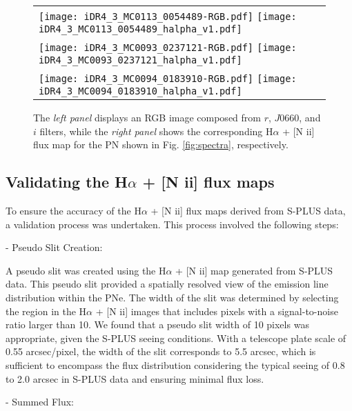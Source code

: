 \documentclass[baaa]{baaa}
\begin{document}
\begin{figure}[h]
\centering
\begin{tabular}{l l}
  \texttt{[image: iDR4\_3\_MC0113\_0054489-RGB.pdf]}
  \texttt{[image: iDR4\_3\_MC0113\_0054489\_halpha\_v1.pdf]} \\
  \texttt{[image: iDR4\_3\_MC0093\_0237121-RGB.pdf]}
  \texttt{[image: iDR4\_3\_MC0093\_0237121\_halpha\_v1.pdf]} \\
  \texttt{[image: iDR4\_3\_MC0094\_0183910-RGB.pdf]}
  \texttt{[image: iDR4\_3\_MC0094\_0183910\_halpha\_v1.pdf]}
  
  \end{tabular}  
  \caption{
  The \emph{left panel} displays an RGB image composed from $r$, $J0660$, and $i$ filters, while the \emph{right panel} shows the corresponding  H$\alpha$ + [N {\sc ii}] flux map for the PN shown in Fig. \ref{fig:spectra}, respectively.}
\label{fig:halpha-maps}
\end{figure}
    
\subsection{Validating the  H$\alpha$ + [N {\sc ii}] flux maps}\label{sec:val}

    
To ensure the accuracy of the H$\alpha$ + [N {\sc ii}] flux maps derived from S-PLUS data, a validation process was undertaken. This process involved the following steps:

- Pseudo Slit Creation:

A pseudo slit was created using the H$\alpha$ + [N {\sc ii}] map generated from S-PLUS data. This pseudo slit provided a spatially resolved view of the emission line distribution within the PNe. The width of the slit was determined by selecting the region in the H$\alpha$ + [N {\sc ii}] images that includes pixels with a signal-to-noise ratio larger than 10. We found that a pseudo slit width of 10 pixels was appropriate, given the S-PLUS seeing conditions. With a telescope plate scale of 0.55 arcsec/pixel, the width of the slit corresponds to 5.5 arcsec, which is sufficient to encompass the flux distribution considering the typical seeing of 0.8 to 2.0 arcsec in S-PLUS data and ensuring minimal flux loss.

- Summed Flux:
\end{document}
